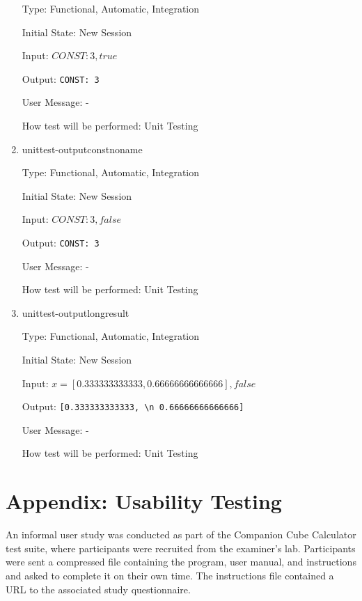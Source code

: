 \documentclass[12pt, titlepage]{article}
\newcommand{\progname}{Companion Cube Calculator} %
\begin{document}
\begin{enumerate}
	Type: Functional, Automatic, Integration
	
	Initial State: New Session
	
	Input: $CONST: 3, true$
	
	Output: \texttt{CONST: 3}
	
	User Message: - 
	
	How test will be performed: Unit Testing\\
	
	\item{unittest-outputconstnoname}
	
	Type: Functional, Automatic, Integration
	
	Initial State: New Session
	
	Input: $CONST: 3, false$
	
	Output: \texttt{CONST: 3}
	
	User Message: - 
	
	How test will be performed: Unit Testing\\
	
	\item{unittest-outputlongresult}
	
	Type: Functional, Automatic, Integration
	
	Initial State: New Session
	
	Input: $x = [0.333333333333, 0.66666666666666], false$
	
	Output: \texttt{[0.333333333333, \textbackslash n 0.66666666666666]}
	
	User Message: - 
	
	How test will be performed: Unit Testing\\
	
\end{enumerate}

%

%

\newpage

\section{Appendix: Usability Testing}
\label{appendix_userstudy}
An informal user study was conducted as part of the \progname{} test suite, 
where participants were recruited from the examiner's lab. Participants were 
sent a compressed file containing the program, user manual, and instructions 
and asked to complete it on their own time. The instructions file contained a 
URL to the associated study questionnaire. 
\end{document}
